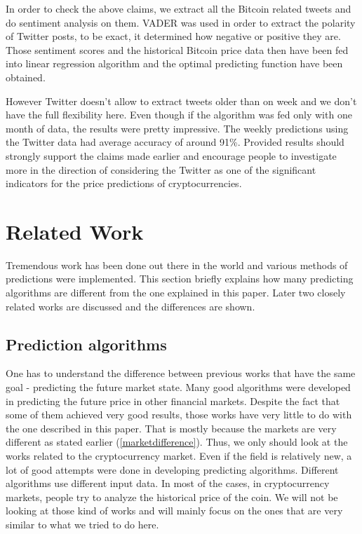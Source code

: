 \documentclass[a4paper,11pt,oneside]{article}
\begin{document}
  In order to check the above claims, we extract all the Bitcoin related tweets and do sentiment analysis on them. VADER \cite{vader} was used in order to extract the polarity of Twitter posts, to be exact, it determined how negative or positive they are. Those sentiment scores and the historical Bitcoin price data then have been fed into linear regression algorithm and the optimal predicting function have been obtained.
  
  However Twitter doesn't allow to extract tweets older than on week and we don't have the full flexibility here. Even though if the algorithm was fed only with one month of data, the results were pretty impressive. The weekly predictions using the Twitter data had average accuracy of around 91\%. Provided results should  strongly support the claims made earlier and encourage people to investigate more in the direction of considering the Twitter as one of the significant indicators for the price predictions of cryptocurrencies.
  

  \section{Related Work}
  
  \label{relatedwork}
  
  Tremendous work has been done out there in the world and various methods of predictions were implemented. This section briefly explains how many predicting algorithms are different from the one explained in this paper. Later two closely related works are discussed and the differences are shown.
  
  \subsection{Prediction algorithms}

  One has to understand the difference between previous works that have the same goal - predicting the future market state. Many good algorithms were developed in predicting the future price in other financial markets. Despite the fact that some of them achieved very good results, those works have very little to do with the one described in this paper. That is mostly because the markets are very different as stated earlier (\ref{marketdifference}). Thus, we only should look at the works related to the cryptocurrency market. Even if the field is relatively new, a lot of good attempts were done in developing predicting algorithms. Different algorithms use different input data. In most of the cases, in cryptocurrency markets, people try to analyze the historical price of the coin. We will not be looking at those kind of works and will mainly focus on the ones that are very similar to what we tried to do here.
  
\end{document}
